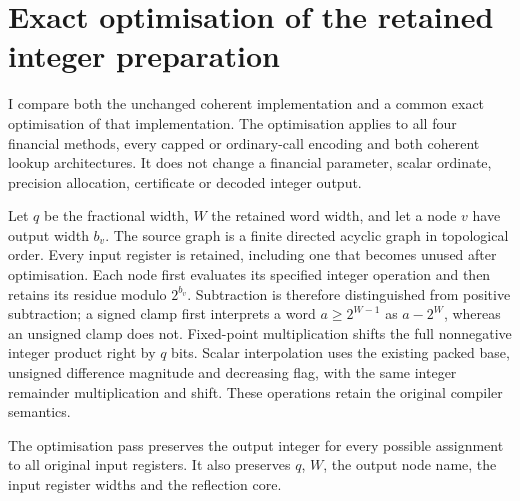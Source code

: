 \section{Exact optimisation of the retained integer preparation}
\label{sec:integer-optimisation-proof}

I compare both the unchanged coherent implementation and a common exact
optimisation of that implementation. The optimisation applies to all four
financial methods, every capped or ordinary-call encoding and both coherent
lookup architectures. It does not change a financial parameter, scalar
ordinate, precision allocation, certificate or decoded integer output.

Let $q$ be the fractional width, $W$ the retained word width, and let a node
$v$ have output width $b_v$. The source graph is a finite directed acyclic
graph in topological order. Every input register is retained, including one
that becomes unused after optimisation. Each node first evaluates its
specified integer operation and then retains its residue modulo $2^{b_v}$.
Subtraction is therefore distinguished from positive subtraction; a signed
clamp first interprets a word $a\geq2^{W-1}$ as $a-2^W$, whereas an unsigned
clamp does not. Fixed-point multiplication shifts the full nonnegative
integer product right by $q$ bits. Scalar interpolation uses the existing
packed base, unsigned difference magnitude and decreasing flag, with the
same integer remainder multiplication and shift. These operations retain
the original compiler semantics.

\begin{proposition}
The optimisation pass preserves the output integer for every possible
assignment to all original input registers. It also preserves $q$, $W$,
the output node name, the input register widths and the reflection core.
\end{proposition}

